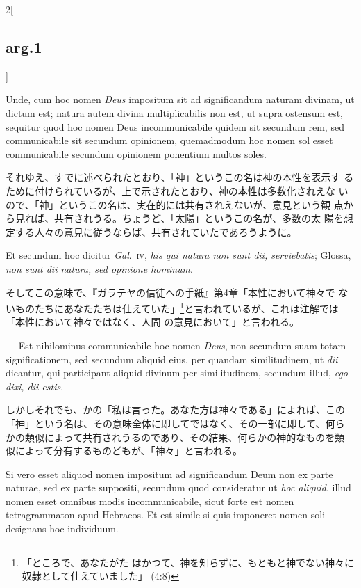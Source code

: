 \documentclass[paper=a4paper,fontsize=10pt,jafontsize=9pt,titlepage]{jlreq}
\begin{document}
\begin{paracol}{2}[\subsection{arg.1}]
\switchcolumn*

Unde, cum hoc nomen {\itshape Deus} impositum sit ad significandum
naturam divinam, ut dictum est; natura autem divina multiplicabilis
non est, ut supra ostensum est, sequitur quod hoc nomen Deus
incommunicabile quidem sit secundum rem, sed communicabile sit
secundum opinionem, quemadmodum hoc nomen sol esset communicabile
secundum opinionem ponentium multos soles.

\switchcolumn

それゆえ、すでに述べられたとおり、「神」というこの名は神の本性を表示す
るために付けられているが、上で示されたとおり、神の本性は多数化されえな
いので、「神」というこの名は、実在的には共有されえないが、意見という観
点から見れば、共有されうる。ちょうど、「太陽」というこの名が、多数の太
陽を想定する人々の意見に従うならば、共有されていたであろうように。

\switchcolumn*

Et secundum hoc dicitur {\itshape Gal}.~{\scshape iv}, {\itshape his
qui natura non sunt dii, serviebatis}; Glossa, {\itshape non sunt dii
natura, sed opinione hominum}.

\switchcolumn

そしてこの意味で、『ガラテヤの信徒への手紙』第4章「本性において神々で
ないものたちにあなたたちは仕えていた」\footnote{「ところで、あなたがた
はかつて、神を知らずに、もともと神でない神々に奴隷として仕えていました」
(4:8)}と言われているが、これは注解では「本性において神々ではなく、人間
の意見において」と言われる。

\switchcolumn*

--- Est nihilominus communicabile hoc nomen {\itshape Deus}, non
secundum suam totam significationem, sed secundum aliquid eius, per
quandam similitudinem, ut {\itshape dii} dicantur, qui participant
aliquid divinum per similitudinem, secundum illud, {\itshape ego dixi,
dii estis}.

\switchcolumn

しかしそれでも、かの「私は言った。あなた方は神々である」によれば、この
「神」という名は、その意味全体に即してではなく、その一部に即して、何ら
かの類似によって共有されうるのであり、その結果、何らかの神的なものを類
似によって分有するものどもが、「神々」と言われる。

\switchcolumn*

Si vero esset aliquod nomen impositum ad significandum Deum non ex
parte naturae, sed ex parte suppositi, secundum quod consideratur ut
{\itshape hoc aliquid}, illud nomen esset omnibus modis
incommunicabile, sicut forte est nomen tetragrammaton apud
Hebraeos. Et est simile si quis imponeret nomen soli designans hoc
individuum.


\end{paracol}
\end{document}
